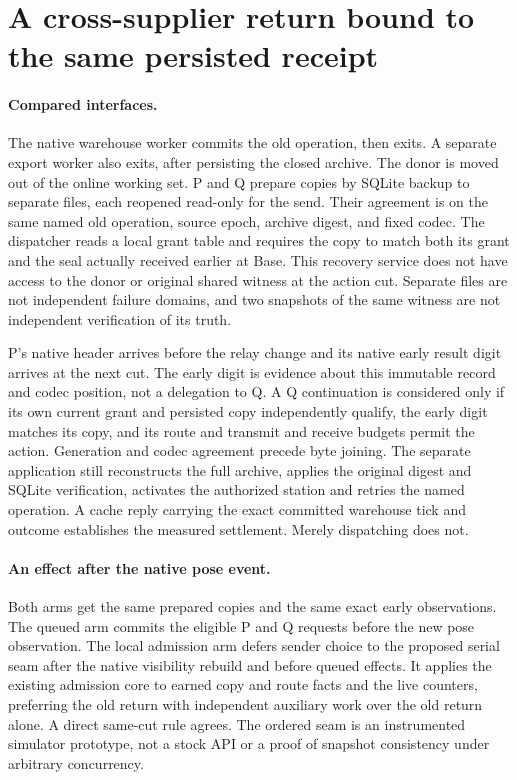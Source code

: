 \documentclass{article}
\begin{document}
\section*{A cross-supplier return bound to the same persisted receipt}
\paragraph{Compared interfaces.}
The native warehouse worker commits the old operation, then exits.
A separate export worker also exits, after persisting the closed
archive. The donor is moved out of the online working set. P and Q
prepare copies by SQLite backup to separate files, each reopened
read-only for the send. Their agreement is on the same named
old operation, source epoch, archive digest, and fixed codec. The
dispatcher reads a local grant table and requires the copy to match
both its grant and the seal actually received earlier at Base.
This recovery service does not have access to the donor or original
shared witness at the action cut. Separate files are not independent
failure domains, and two snapshots of the same witness are not
independent verification of its truth.

P's native header arrives before the relay change and its native early
result digit arrives at the next cut. The early digit is evidence
about this immutable record and codec position, not a delegation to
Q. A Q continuation is considered only if its own current grant and
persisted copy independently qualify, the early digit matches its
copy, and its route and transmit and receive budgets permit the
action. Generation and codec agreement precede byte joining. The
separate application still reconstructs the full archive, applies the
original digest and SQLite verification, activates the authorized
station and retries the named operation. A cache reply carrying the exact committed
warehouse tick and outcome establishes the measured settlement. Merely dispatching
does not.

\paragraph{An effect after the native pose event.}
Both arms get the same prepared copies and the same exact early
observations. The queued arm commits the eligible P and Q requests
before the new pose observation. The local admission arm defers
sender choice to the proposed serial seam after the native visibility
rebuild and before queued effects. It applies the existing admission
core to earned copy and route facts and the live counters, preferring
the old return with independent auxiliary work over the old return
alone. A direct same-cut rule agrees. The ordered seam is an
instrumented simulator prototype, not a stock API or a proof of
snapshot consistency under arbitrary concurrency.
\end{document}
